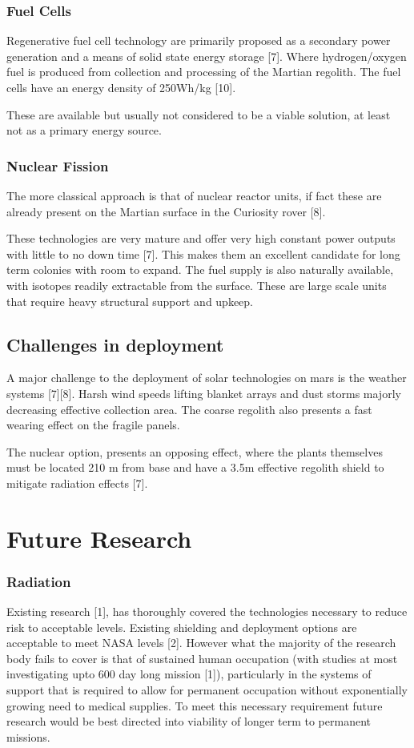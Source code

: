 \documentclass[12pt]{article}
\begin{document}
\subsubsection*{Fuel Cells}
Regenerative fuel cell technology are primarily proposed as a secondary power generation and a means of solid state energy storage [7]. Where hydrogen/oxygen fuel is produced from collection and processing of the Martian regolith. The fuel cells have an energy density of
250Wh/kg [10].

These are available but usually not considered to be a viable solution, at least not as a primary energy source.
\subsubsection*{Nuclear Fission}
The more classical approach is that of nuclear reactor units, if fact these are already present on the Martian surface in the Curiosity rover [8].

These technologies are very mature and offer very high constant power outputs with little to no down time [7]. This makes them an excellent candidate for long term colonies with room to expand. The fuel supply is also naturally available, with isotopes readily extractable from the surface.
These are large scale units that require heavy structural support and upkeep.
\subsection{Challenges in deployment}
A major challenge to the deployment of solar technologies on mars is the weather systems [7][8]. Harsh wind speeds lifting blanket arrays and dust storms majorly decreasing effective collection area. The coarse regolith also presents a fast wearing effect on the fragile panels.

The nuclear option, presents an opposing effect, where the plants themselves must be located 210 m from base and have a 3.5m effective regolith shield to mitigate radiation effects [7].

\section{Future Research}
\subsubsection*{Radiation}
Existing research [1], has thoroughly covered the technologies necessary to reduce risk to acceptable levels. Existing shielding and deployment options are acceptable to meet NASA levels [2]. However what the majority of the research body fails to cover is that of sustained human occupation (with studies at most investigating upto 600 day long mission [1]), particularly in the systems of support that is required to allow for permanent occupation without exponentially growing need to medical supplies. To meet this necessary requirement future research would be best directed into viability of longer term to permanent missions.
\end{document}
